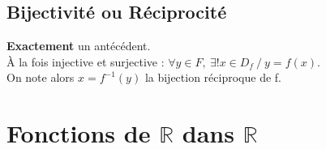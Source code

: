 \documentclass[13pt, twoside, a4paper, french]{report}
\begin{document}
    \subsection{Bijectivité ou Réciprocité}\label{subsec:bijectivite-ou-reciprocite}
      \textbf{Exactement} un antécédent.\\
      À la fois injective et surjective : $\forall y \in F,\ \exists! x \in D_f\ /\ y = f(x)$.\\
      On note alors $x = f^{-1}(y)$ la bijection réciproque de f.
  
  
  \section{Fonctions de $\mathbb{R}$ dans $\mathbb{R}$}\label{sec:fonctions-de-r-dans-r}
\end{document}
